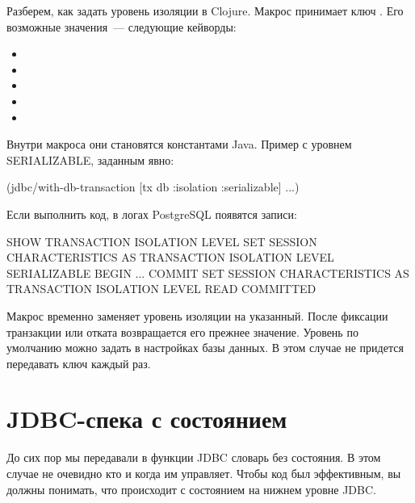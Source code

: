 Разберем, как задать уровень изоляции в Clojure. Макрос  принимает ключ . Его возможные значения~--- следующие кейворды:

\begin{itemize}

\item

\item

\item

\item

\item

\end{itemize}

Внутри макроса они становятся константами Java. Пример с уровнем SERIALIZABLE, заданным явно:

\begin{english}
  \begin{clojure}
(jdbc/with-db-transaction
  [tx db {:isolation :serializable}]
  ...)
  \end{clojure}
\end{english}

Если выполнить код, в логах PostgreSQL появятся записи:

\begin{english}
  \begin{sql}
SHOW TRANSACTION ISOLATION LEVEL
SET SESSION CHARACTERISTICS
  AS TRANSACTION ISOLATION LEVEL SERIALIZABLE
BEGIN
...
COMMIT
SET SESSION CHARACTERISTICS
  AS TRANSACTION ISOLATION LEVEL READ COMMITTED
  \end{sql}
\end{english}

Макрос временно заменяет уровень изоляции на указанный. После фиксации транзакции или отката возвращается его прежнее значение. Уровень по умолчанию можно задать в настройках базы данных. В этом случае не придется передавать ключ  каждый раз.

\section{JDBC-спека с состоянием}

До сих пор мы передавали в функции JDBC словарь без состояния. В этом случае не очевидно кто и когда им управляет. Чтобы код был эффективным, вы должны понимать, что происходит с состоянием на нижнем уровне JDBC.

